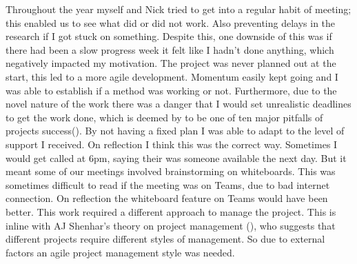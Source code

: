
Throughout the year myself and Nick tried to get into a regular habit of meeting; this enabled us to see what did or did not work. Also preventing delays in the research if I got stuck on something. Despite this, one downside of this was if there had been a slow progress week it felt like I hadn't done anything, which negatively impacted my motivation. The project was never planned out at the start, this led to a more agile development. Momentum easily kept going and I was able to establish if a method was working or not. Furthermore, due to the novel nature of the work there was a danger that I would set unrealistic deadlines to get the work done, which is deemed by \citeauthor{GanttPRO} to be one of ten major pitfalls of projects success(\cite{GanttPRO}). By not having a fixed plan I was able to adapt to the level of support I received. On reflection I think this was the correct way. Sometimes I would get called at 6pm, saying their was someone available the next day. But it meant some of our meetings involved brainstorming on whiteboards. This was sometimes difficult to read if the meeting was on Teams, due to bad internet connection. On reflection the whiteboard feature on Teams would have been better.  This work required a different approach to manage the project. This is inline with AJ Shenhar's theory on project management (\cite{Shenhar1}), who suggests that different projects require different styles of management. So due to external factors an agile project management style was needed.


